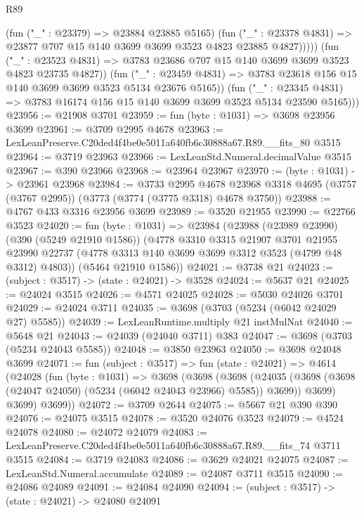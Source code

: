 \begin{lexlean}{R89}
\begin{coremodule}
                    (fun ("_" : @23379) => @23884 @23885 @5165)
                    (fun ("_" : @23378 @4831) =>
                    @23877 @707 @15 @140 @3699 @3699 @3523 @4823 @23885 @4827)))))
            (fun ("_" : @23523 @4831) =>
            @3783 @23686 @707 @15 @140 @3699 @3699 @3523 @4823 @23735 @4827))
          (fun ("_" : @23459 @4831) =>
          @3783 @23618 @156 @15 @140 @3699 @3699 @3523 @5134 @23676 @5165))
        (fun ("_" : @23345 @4831) =>
        @3783 @16174 @156 @15 @140 @3699 @3699 @3523 @5134 @23590 @5165)))
@23956 := @21908 @3701
@23959 := fun (byte : @1031) => @3698 @23956 @3699
@23961 := @3709 @2995 @4678
@23963 := LexLeanPreserve.C20ded4f4be0e5011a640fb6c30888a67.R89.__fits_80 @3515
@23964 := @3719 @23963
@23966 := LexLeanStd.Numeral.decimalValue @3515
@23967 := @390 @23966
@23968 := @23964 @23967
@23970 := (byte : @1031) -> @23961 @23968
@23984 := @3733
    @2995
    @4678
    @23968
    @3318
    @4695
    (@3757 (@3767 @2995))
    (@3773 (@3774 (@3775 @3318) @4678 @3750))
@23988 := @4767 @433 @3316 @23956 @3699
@23989 := @3520 @21955
@23990 := @22766 @3523
@24020 := fun (byte : @1031) =>
  @23984
    (@23988
      (@23989 @23990)
      (@390 (@5249 @21910 @1586))
      (@4778
        @3310
        @3315
        @21907
        @3701
        @21955
        @23990
        @22737
        (@4778 @3313 @140 @3699 @3699 @3312 @3523 (@4799 @48 @3312) @4803))
      (@5464 @21910 @1586))
@24021 := @3738 @21
@24023 := (subject : @3517) -> (state : @24021) -> @3528
@24024 := @5637 @21
@24025 := @24024 @3515
@24026 := @4571 @24025
@24028 := @5030 @24026 @3701
@24029 := @24024 @3711
@24035 := @3698 (@3703 (@5234 (@6042 @24029 @27) @5585))
@24039 := LexLeanRuntime.multiply @21 instMulNat
@24040 := @5648 @21
@24043 := @24039 (@24040 @3711) @383
@24047 := @3698 (@3703 (@5234 @24043 @5585))
@24048 := @3850 @23963
@24050 := @3698 @24048 @3699
@24071 := fun (subject : @3517) =>
  fun (state : @24021) =>
  @4614
    (@24028
      (fun (byte : @1031) =>
      @3698
        (@3698
          (@3698
            (@24035 (@3698 (@3698 (@24047 @24050) (@5234 (@6042 @24043 @23966) @5585)) @3699))
            @3699)
          @3699)
        @3699))
@24072 := @3709 @2644
@24075 := @5667 @21 @390 @390
@24076 := @24075 @3515
@24078 := @3520 @24076 @3523
@24079 := @4524 @24078
@24080 := @24072 @24079
@24083 := LexLeanPreserve.C20ded4f4be0e5011a640fb6c30888a67.R89.__fits_74 @3711 @3515
@24084 := @3719 @24083
@24086 := @3629 @24021 @24075
@24087 := LexLeanStd.Numeral.accumulate
@24089 := @24087 @3711 @3515
@24090 := @24086 @24089
@24091 := @24084 @24090
@24094 := (subject : @3517) -> (state : @24021) -> @24080 @24091

\end{coremodule}
\end{lexlean}
